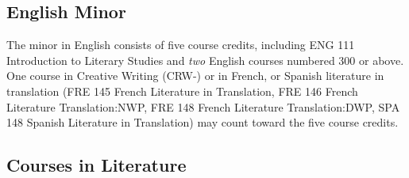 \documentclass[
  letterpaper,
]{scrbook}
\begin{document}
\subsection{English Minor}\label{english-minor}

The minor in English consists of five course credits, including ENG 111
Introduction to Literary Studies and \emph{two} English courses numbered
300 or above. One course in Creative Writing (CRW-) or in French, or
Spanish literature in translation (FRE 145 French Literature in
Translation, FRE 146 French Literature Translation:NWP, FRE 148 French
Literature Translation:DWP, SPA 148 Spanish Literature in Translation)
may count toward the five course credits.

\subsection{Courses in Literature}\label{courses-in-literature}
\end{document}
